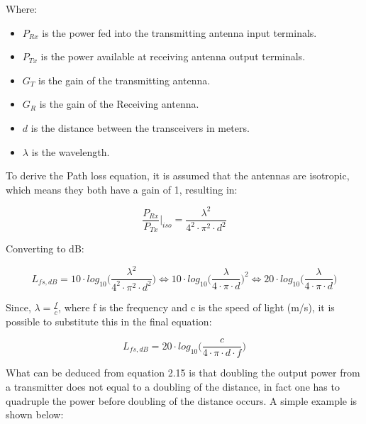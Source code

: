 Where:

\begin{itemize}
  \item $P_{Rx}$ is the power fed into the transmitting antenna input terminals.
  \item $P_{Tx}$ is the power available at receiving antenna output terminals.
  \item $G_T$ is the gain of the transmitting antenna.
  \item $G_R$ is the gain of the Receiving antenna.
  \item $d$ is the distance between the transceivers in meters.
  \item $\lambda$ is the wavelength.
\end{itemize}

To derive the Path loss equation, it is assumed that the antennas are isotropic, which means they both have a gain of 1, resulting in:

\begin{equation}
    \frac{P_{Rx}}{P_{Tx}}|_{iso} =  \frac{\lambda^2}{4^2 \cdot \pi^2 \cdot d^2}
\end{equation}



Converting to dB:

\begin{equation}
    L_{fs,dB} =  10 \cdot log_{10}\Big(\frac{\lambda^2}{4^2 \cdot \pi^2 \cdot d^2}\Big) \Leftrightarrow 10 \cdot log_{10}\Big(\frac{\lambda}{4 \cdot \pi \cdot d}\Big)^2 \Leftrightarrow 20 \cdot log_{10}\Big(\frac{\lambda}{4 \cdot \pi \cdot d}\Big) 
\end{equation}

Since, $\lambda = \frac{f}{c}$, where f is the frequency and c is the speed of light (m/s), it is possible to substitute this in the final equation:

\begin{equation}
    L_{fs,dB} = 20 \cdot log_{10}\Big(\frac{c}{4 \cdot \pi \cdot d \cdot f}\Big) 
\end{equation}

What can be deduced from equation 2.15 is that doubling the output power from a transmitter does not equal to a doubling of the distance, in fact one has to quadruple the power before doubling of the distance occurs. A simple example is shown below:

